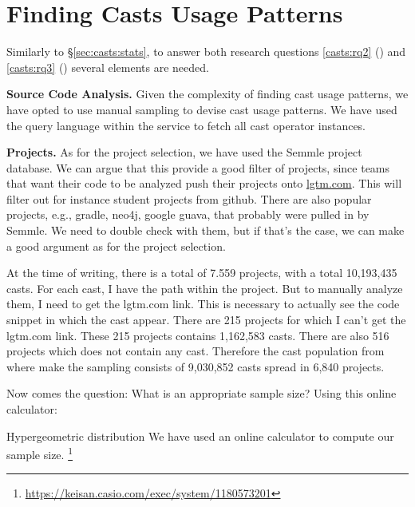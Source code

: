 \section{Finding Casts Usage Patterns}
\label{sec:casts:methodology}

Similarly to \S\ref{sec:casts:stats}, to answer both research questions
\ref{casts:rq2} (\emph{\crqB}) and \ref{casts:rq3} (\emph{\crqC}) several elements are needed.

\textbf{Source Code Analysis.}
Given the complexity of finding cast usage patterns, we have opted to use manual sampling to devise cast usage patterns.
We have used the \ql{} query language within the \lgtm{} service to fetch all cast operator instances.

\textbf{Projects.}
As for the project selection, we have used the Semmle project database.
We can argue that this provide a good filter of projects,
since teams that want their code to be analyzed push their projects onto \href{https://lgtm.com}{lgtm.com}.
This will filter out for instance student projects from github.
There are also popular projects, e.g., gradle, neo4j, google guava,
that probably were pulled in by Semmle.
We need to double check with them, but if that’s the case,
we can make a good argument as for the project selection.

At the time of writing, there is a total of 7.559 projects, with a total 10,193,435 casts.
For each cast, I have the path within the project.
But to manually analyze them, I need to get the lgtm.com link.
This is necessary to actually see the code snippet in which the cast appear.
There are 215 projects for which I can’t get the lgtm.com link.
These 215 projects contains 1,162,583 casts.
There are also 516 projects which does not contain any cast.
Therefore the cast population from where make the sampling consists of
9,030,852 casts spread in 6,840 projects.

Now comes the question: What is an appropriate sample size?
Using this online calculator:

Hypergeometric distribution
We have used an online calculator to compute our sample size.%
\footnote{\url{https://keisan.casio.com/exec/system/1180573201}}




